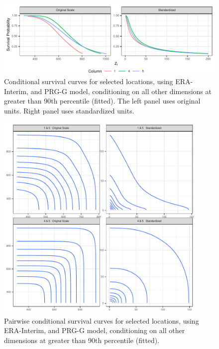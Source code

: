 \begin{figure}[htb]
    \centering
    \caption{Conditional survival curves for selected locations, using ERA-Interim, and PRG-G model,  conditioning on all other dimensions at greater than 90th percentile (fitted)\label{fig:condsurv1d}. The left panel uses original units. Right panel uses standardized units.}
    \includegraphics[width=\linewidth]{./images/condsurv_1d}
\end{figure}

\begin{figure}[htb]
    \centering
    \caption{Pairwise conditional survival curves for selected locations, using ERA-Interim, and PRG-G model, conditioning on all other dimensions at greater than 90th percentile (fitted).\label{fig:condsurv2d}}
    \includegraphics[height=4in, width=4in]{./images/condsurv_2d}
\end{figure}

